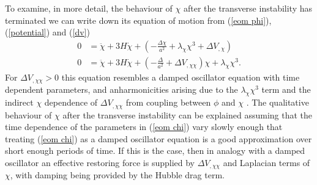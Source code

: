 \documentclass[letterpaper,11pt]{article}
\begin{document}
To examine, in more detail, the behaviour of $\chi$ after the transverse instability has terminated we can write down its equation of motion from (\ref{eom phi}), (\ref{potential}) and (\ref{dv})
\begin{align}
0 &= \ddot{\chi} + 3H\dot{\chi} + (-\frac{\Delta \chi}{a^2} + \lambda_{\chi}\chi^3 + \Delta V_{,\chi})\\
0 &= \ddot{\chi} + 3H\dot{\chi} + (-\frac{\Delta}{a^2} + \Delta V_{,\chi \chi})\chi + \lambda_{\chi}\chi^3. \label{eom chi}
\end{align} 
For $\Delta V_{,\chi \chi}>0$ this equation resembles a damped oscillator equation with time dependent parameters, and anharmonicities arising due to the $\lambda_{\chi}\chi^3$ term and the indirect $\chi$ dependence of $\Delta V_{,\chi \chi}$ from coupling between $\phi$ and $\chi$ . The qualitative behaviour of $\chi$ after the transverse instability can be explained assuming that the time dependence of the parameters in (\ref{eom chi}) vary slowly enough that treating (\ref{eom chi}) as a damped oscillator equation is a good approximation over short enough periods of time. If this is the case, then in analogy with a damped oscillator an effective restoring force is supplied by $\Delta V_{,\chi \chi}$ and Laplacian terms of $\chi$, with damping being provided by the Hubble drag term.
\end{document}
